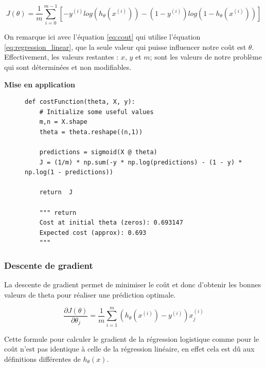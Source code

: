     \begin{equation}\label{eq:cout}
       J(\theta) = \frac{1}{m} \sum_{i=0}^{m-1}[-y^{(i)} log(h_\theta(x^{(i)})) - (1-y^{(i)}) log(1-h_\theta(x^{(i)}))]
    \end{equation}
 
    On remarque ici avec l'équation \ref{eq:cout} qui utilise l'équation \ref{eq:regression_linear}, que la seule valeur qui puisse influencer notre coût est $\theta$. Effectivement, les valeurs restantes : $x$, $y$ et $m$; sont les valeurs
    de notre problème qui sont déterminées et non modifiables.
    
    
    \vspace{.5cm}
    \noindent
    \textbf{Mise en application}
    \vspace{.2cm}

\begin{figure}[!h]
\begin{verbatim}
def costFunction(theta, X, y):
    # Initialize some useful values
    m,n = X.shape   
    theta = theta.reshape((n,1)) 
                
    predictions = sigmoid(X @ theta)
    J = (1/m) * np.sum(-y * np.log(predictions) - (1 - y) * np.log(1 - predictions))
    
    return  J

    """ return
    Cost at initial theta (zeros): 0.693147
    Expected cost (approx): 0.693
    """
\end{verbatim}   
\end{figure}


\subsubsection{Descente de gradient}

La descente de gradient permet de minimiser le coût et donc d'obtenir les bonnes valeurs de theta pour réaliser une prédiction optimale.

\begin{equation}\label{eq:descente-gradient}
    \frac{\partial J(\theta)}{\partial \theta_j} = \frac{1}{m} \sum_{i=1}^{m} (h_\theta(x^{(i)}) - y^{(i)}) x_j^{(i)}
\end{equation}

\noindent
Cette formule pour calculer le gradient de la régression logistique comme pour le coût n'est pas identique à celle de la régression linéaire, en effet cela est dû aux définitions différentes de \( h_\theta (x) \).

